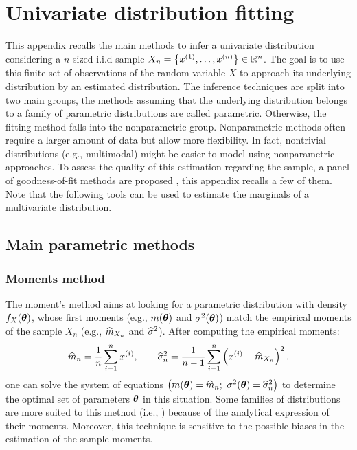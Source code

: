 \cleardoublepage
\chapter{Univariate distribution fitting}
\label{apx:A}

This appendix recalls the main methods to infer a univariate distribution considering a $n$-sized i.i.d sample $X_n = \left\{x^{(1)}, \dots, x^{(n)}\right\} \in \mathbb{R}^{n}$. 
The goal is to use this finite set of observations of the random variable $X$ to approach its underlying distribution by an estimated distribution.
The inference techniques are split into two main groups, the methods assuming that the underlying distribution belongs to a family of parametric distributions are called parametric. 
Otherwise, the fitting method falls into the nonparametric group. 
Nonparametric methods often require a larger amount of data but allow more flexibility. 
In fact, nontrivial distributions (e.g., multimodal) might be easier to model using nonparametric approaches.
To assess the quality of this estimation regarding the sample, a panel of goodness-of-fit methods are proposed , this appendix recalls a few of them. 
Note that the following tools can be used to estimate the marginals of a multivariate distribution.

\section{Main parametric methods}

\subsection*{Moments method}
The moment's method aims at looking for a parametric distribution with density $f_X({\boldsymbol{\theta}})$, whose first moments (e.g., $m({\boldsymbol{\theta}})$ and $\sigma^2({\boldsymbol{\theta}})$) match 
the empirical moments of the sample $X_n$ (e.g., $\widehat{m}_{X_n}$ and $\widehat{\sigma}^2$). After computing the empirical moments: 
\begin{equation}
    \widehat{m}_{n} = \frac1n \sum_{i=1}^{n} x^{(i)}, \qquad \widehat{\sigma}^2_n = \frac{1}{n-1} \sum_{i=1}^{n} \left(x^{(i)} - \widehat{m}_{X_n}\right)^2,
\end{equation} 
one can solve the system of equations $\left(m(\btheta) = \what{m}_{n}; \ \sigma^2(\btheta) = \what{\sigma}_n^2\right)$ to determine the optimal set of parameters ${\boldsymbol{\theta}}$ in this situation. 
Some families of distributions are more suited to this method (i.e., ) because of the analytical expression of their moments. 
Moreover, this technique is sensitive to the possible biases in the estimation of the sample moments.

